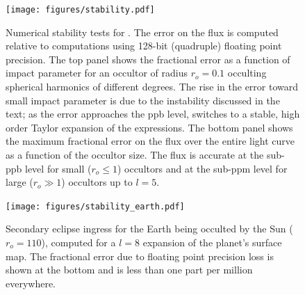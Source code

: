 \documentclass[modern]{aastex61}
\begin{document}
\begin{figure}[ht!]
    \begin{centering}
    \texttt{[image: figures/stability.pdf]}
    \caption{\label{fig:stability}
             Numerical stability tests for \starry. The error on the flux is computed relative
             to computations using 128-bit (quadruple) floating point precision. The top panel
             shows the fractional error as a function of impact parameter for an occultor of
             radius $r_o = 0.1$ occulting spherical harmonics of different degrees. The rise
             in the error toward small impact parameter is due to the instability
             discussed in the text; as the error approaches the ppb level, \starry switches
             to a stable, high order Taylor expansion of the expressions. The bottom panel
             shows the maximum fractional error on the flux over the entire light curve
             as a function of the occultor size. The flux is accurate at the sub-ppb level
             for small ($r_o \leq 1$) occultors and at the sub-ppm level for large
             ($r_o \gg 1$) occultors up to $l = 5$.}
    \end{centering}
\end{figure}

\begin{figure}[ht!]
    \begin{centering}
    \texttt{[image: figures/stability\_earth.pdf]}
    \caption{\label{fig:stability_earth}
             Secondary eclipse ingress for the Earth being occulted by the Sun
             ($r_o = 110$), computed for a $l = 8$ expansion of the planet's
             surface map. The fractional error due to floating point precision loss
             is shown at the bottom and is
             less than one part per million everywhere.}
    \end{centering}
\end{figure}

%
\end{document}
